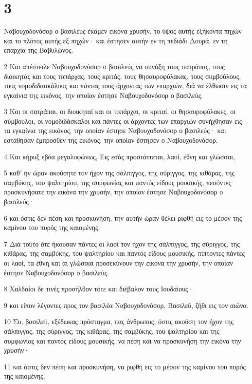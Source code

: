 \chapter{3}

\par Ναβουχοδονόσορ ο βασιλεύς έκαμεν εικόνα χρυσήν, το ύψος αυτής εξήκοντα πηχών και το πλάτος αυτής εξ πηχών· και έστησεν αυτήν εν τη πεδιάδι Δουρά, εν τη επαρχία της Βαβυλώνος.
\par 2 Και απέστειλε Ναβουχοδονόσορ ο βασιλεύς να συνάξη τους σατράπας, τους διοικητάς και τους τοπάρχας, τους κριτάς, τους θησαυροφύλακας, τους συμβούλους, τους νομοδιδασκάλους και πάντας τους άρχοντας των επαρχιών, διά να έλθωσιν εις τα εγκαίνια της εικόνος, την οποίαν έστησε Ναβουχοδονόσορ ο βασιλεύς.
\par 3 Και οι σατράπαι, οι διοικηταί και οι τοπάρχαι, οι κριταί, οι θησαυροφύλακες, οι σύμβουλοι, οι νομοδιδάσκαλοι και πάντες οι άρχοντες των επαρχιών συνήχθησαν εις τα εγκαίνια της εικόνος, την οποίαν έστησε Ναβουχοδονόσορ ο βασιλεύς· και εστάθησαν έμπροσθεν της εικόνος, την οποίαν έστησεν ο Ναβουχοδονόσορ.
\par 4 Και κήρυξ εβόα μεγαλοφώνως, Εις εσάς προστάττεται, λαοί, έθνη και γλώσσαι,
\par 5 καθ' ην ώραν ακούσητε τον ήχον της σάλπιγγος, της σύριγγος, της κιθάρας, της σαμβύκης, του ψαλτηρίου, της συμφωνίας και παντός είδους μουσικής, πεσόντες προσκυνήσατε την εικόνα την χρυσήν, την οποίαν έστησε Ναβουχοδονόσορ ο βασιλεύς·
\par 6 και όστις δεν πέση και προσκυνήση, την αυτήν ώραν θέλει ριφθή εις το μέσον της καμίνου του πυρός της καιομένης.
\par 7 Διά τούτο ότε ήκουσαν πάντες οι λαοί τον ήχον της σάλπιγγος, της σύριγγος, της κιθάρας, της σαμβύκης, του ψαλτηρίου και παντός είδους μουσικής, πίπτοντες πάντες οι λαοί, τα έθνη και αι γλώσσαι προσεκύνουν την εικόνα την χρυσήν, την οποίαν έστησε Ναβουχοδονόσορ ο βασιλεύς.
\par 8 Χαλδαίοι δε τινές προσήλθον τότε και διέβαλον τους Ιουδαίους·
\par 9 και είπον λέγοντες προς τον βασιλέα Ναβουχοδονόσορ, Βασιλεύ, ζήθι εις τον αιώνα.
\par 10 Συ, βασιλεύ, εξέδωκας πρόσταγμα, πας άνθρωπος, όστις ακούση τον ήχον της σάλπιγγος, της σύριγγος, της κιθάρας, της σαμβύκης, του ψαλτηρίου και της συμφωνίας και παντός είδους μουσικής, να πέση και να προσκυνήση την εικόνα την χρυσήν·
\par 11 και όστις δεν πέση και προσκυνήση, να ριφθή εις το μέσον της καμίνου του πυρός της καιομένης.
